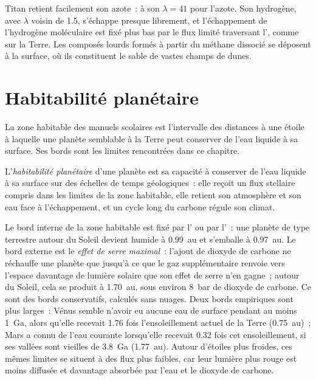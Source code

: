 Titan retient facilement son azote~: à son  $\lambda = 41$ pour
l'azote. Son hydrogène, avec $\lambda$ voisin de 1.5, s'échappe presque librement, et
l'échappement de l'hydrogène moléculaire est fixé plus bas par le flux limité
traversant l', comme sur la Terre. Les composés lourds formés à partir du
méthane dissocié se déposent à la surface, où ils constituent le sable de vastes
champs de dunes.

\section{Habitabilité planétaire}\label{sec:b3:planetary-atmospheres:habitability}

La zone habitable des manuels scolaires est l'intervalle des distances à une
étoile à laquelle une planète semblable à la Terre peut conserver de l'eau liquide à
sa surface. Ses bords sont les limites rencontrées dans ce chapitre.

\begin{definition}\label{def:b3:planetary-atmospheres:habitability}
L'\emph{habitabilité planétaire} d'une
planète est sa capacité à conserver de l'eau liquide à sa surface sur des
échelles de temps géologiques~: elle reçoit un flux stellaire compris dans les
limites de la zone habitable, elle retient son atmosphère et son eau face à
l'échappement, et un cycle long du carbone régule son climat.
\end{definition}

Le bord interne de la zone habitable est fixé par l' ou par
l'~: une planète de type terrestre autour du Soleil devient humide à
\qty{0.99}{au} et s'emballe à \qty{0.97}{au}. Le bord externe est le
\emph{effet de serre maximal}~: l'ajout de dioxyde de carbone ne réchauffe une planète que jusqu'à ce que le gaz
supplémentaire renvoie vers l'espace davantage de lumière solaire que son effet de serre n'en gagne~;
autour du Soleil, cela se produit à
\qty{1.70}{au}, sous environ \qty{8}{bar} de dioxyde de carbone. Ce sont des bords
conservatifs, calculés sans nuages. Deux bords empiriques sont plus larges~:
Vénus semble n'avoir eu aucune eau de surface pendant au moins 1~Ga,
alors qu'elle recevait 1.76 fois l'ensoleillement actuel de la Terre (\qty{0.75}{au})~;
Mars a connu de l'eau courante lorsqu'elle recevait 0.32 fois cet ensoleillement, si ses
vallées sont vieilles de 3.8~Ga (\qty{1.77}{au}). Autour d'étoiles plus froides, ces mêmes limites
se situent à des flux plus faibles, car leur lumière plus rouge est moins diffusée et
davantage absorbée par l'eau et le dioxyde de carbone.

